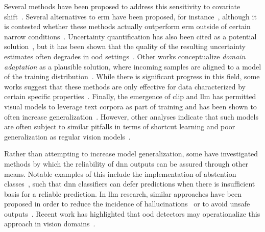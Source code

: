 \documentclass[10pt,twocolumn,letterpaper]{article}
\begin{document}
Several methods have been proposed to address this sensitivity to covariate shift~\cite{oodg_survey}. Several alternatives to \gls{erm} have been proposed, for instance~\cite{IRM, domain_adversarial, dsd_survey}, although it is contested whether these methods actually outperform \gls{erm} outside of certain narrow conditions~\cite{oodbench}. Uncertainty quantification has also been cited as a potential solution~\cite{uq_survey}, but it has been shown that the quality of the resulting uncertainty estimates often degrades in \gls{ood} settings~\cite{eval_uncertainty_estimation}. Other works conceptualize \textit{domain adaptation} as a plausible solution, where incoming samples are aligned to a model of the training distribution~\cite{domain_adaptation, domain_adaptation_2}. While there is significant progress in this field, some works suggest that these methods are only effective for data characterized by certain specific properties~\cite{da_limits}. Finally, the emergence of \gls{clip} and \gls{llm} has permitted visual models to leverage text corpora as part of training and has been shown to often increase generalization~\cite{clip_generalization, data_determines_clip}. However, other analyses indicate that such models are often subject to similar pitfalls in terms of shortcut learning and poor generalization as regular vision models~\cite{clip_shortcuts}. 

Rather than attempting to increase model generalization, some have investigated methods by which the reliability of \gls{dnn} outputs can be assured through other means. Notable examples of this include the implementation of abstention classes~\cite{abstention}, such that \gls{dnn} classifiers can defer predictions when there is insufficient basis for a reliable prediction. In \gls{llm} research, similar approaches have been proposed in order to reduce the incidence of hallucinations~\cite{llm_hallucination_prevention} or to avoid unsafe outputs~\cite{llm_monitoring_i1, llm_monitoring_io1, llm_monitoring_io2}. Recent work has highlighted that \gls{ood} detectors may operationalize this approach in vision domains~\cite{ood_position, rv_lossregression, enase_rv}. 
\end{document}

